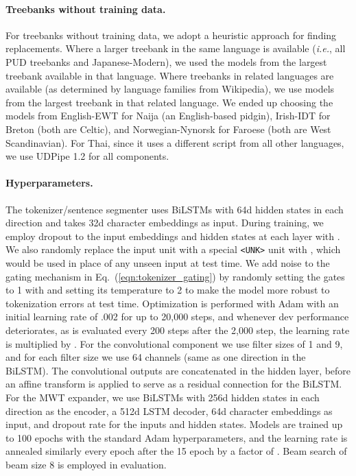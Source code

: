 \documentclass[11pt,a4paper]{article}
\begin{document}
\paragraph{Treebanks without training data.} For treebanks without training data, we adopt a heuristic approach for finding replacements.
Where a larger treebank in the same language is available (\emph{i.e.}, all PUD treebanks and Japanese-Modern), we used the models from the largest treebank available in that language.
Where treebanks in related languages are available (as determined by language families from Wikipedia), we use models from the largest treebank in that related language.
We ended up choosing the models from English-EWT for Naija (an English-based pidgin), Irish-IDT for Breton (both are Celtic), and Norwegian-Nynorsk for Faroese (both are West Scandinavian).
For Thai, since it uses a different script from all other languages, we use UDPipe 1.2 for all components.

\paragraph{Hyperparameters.} The tokenizer\slash sentence segmenter uses BiLSTMs with 64d hidden states in each direction and takes 32d character embeddings as input.
During training, we employ dropout to the input embeddings and hidden states at each layer with .
We also randomly replace the input unit with a special \texttt{<UNK>} unit with , which would be used in place of any unseen input at test time.
We add noise to the gating mechanism in Eq.\ (\ref{eqn:tokenizer_gating}) by randomly setting the gates to 1 with  and setting its temperature to 2 to make the model more robust to tokenization errors at test time.
Optimization is performed with Adam \cite{kingma2015adam} with an initial learning rate of .002 for up to 20,000 steps, and whenever dev performance deteriorates, as is evaluated every 200 steps after the 2,000 step, the learning rate is multiplied by .
For the convolutional component we use filter sizes of 1 and 9, and for each filter size we use 64 channels (same as one direction in the BiLSTM).
The convolutional outputs are concatenated in the hidden layer, before an affine transform is applied to serve as a residual connection for the BiLSTM.
For the MWT expander, we use BiLSTMs with 256d hidden states in each direction as the encoder, a 512d LSTM decoder, 64d character embeddings as input, and dropout rate  for the inputs and hidden states.
Models are trained up to 100 epochs with the standard Adam hyperparameters, and the learning rate is annealed  similarly every epoch after the 15 epoch  by a factor of .
Beam search of beam size 8 is employed in evaluation.
\end{document}
